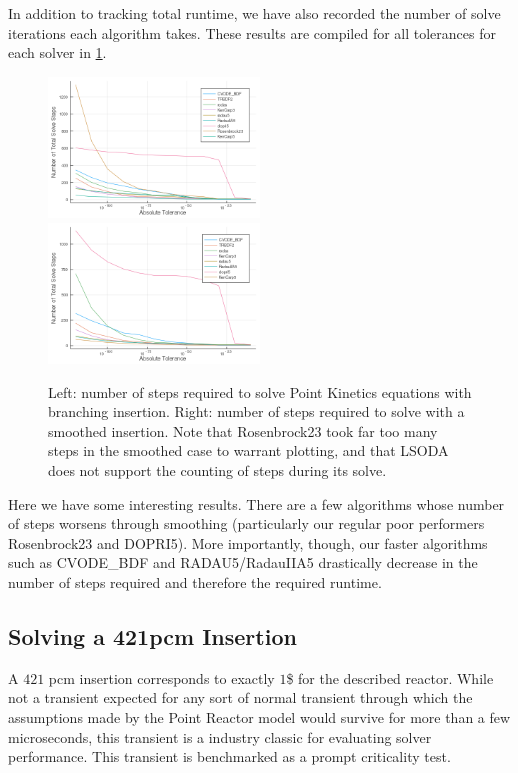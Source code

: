 \documentclass[review,onefignum,onetabnum]{siamart171218}
\begin{document}
In addition to tracking total runtime, we have also recorded the number of solve
iterations each algorithm takes. These results are compiled for all tolerances for
each solver in \cref{fig:num-steps}. \\

\begin{figure}[htb]
  \includegraphics[width=0.5\textwidth]{../plots/step-plots/stepinsert.png}
  \includegraphics[width=0.5\textwidth]{../plots/step-plots/tanhinserts.png}
  \caption{Left: number of steps required to solve Point Kinetics equations with
  branching insertion. Right: number of steps required to solve with a smoothed
  insertion. Note that Rosenbrock23 took far too many steps in the smoothed case
  to warrant plotting, and that LSODA does not support the counting of steps during
  its solve.}
  \label{fig:num-steps}
\end{figure}

Here we have some interesting results. There are a few algorithms whose number of
steps worsens through smoothing (particularly our regular poor performers Rosenbrock23
and DOPRI5). More importantly, though, our faster algorithms such as CVODE\_BDF and
RADAU5/RadauIIA5 drastically decrease in the number of steps required and therefore
the required runtime.

\subsection{Solving a 421pcm Insertion}
A $421$ pcm insertion corresponds to exactly $1$\$ for the described reactor.
While not a transient expected for any sort of normal transient through which the
assumptions made by the Point Reactor model would survive for more than a few microseconds,
this transient is a industry classic for evaluating solver performance. This transient
is benchmarked as a prompt criticality test. \\
\end{document}
